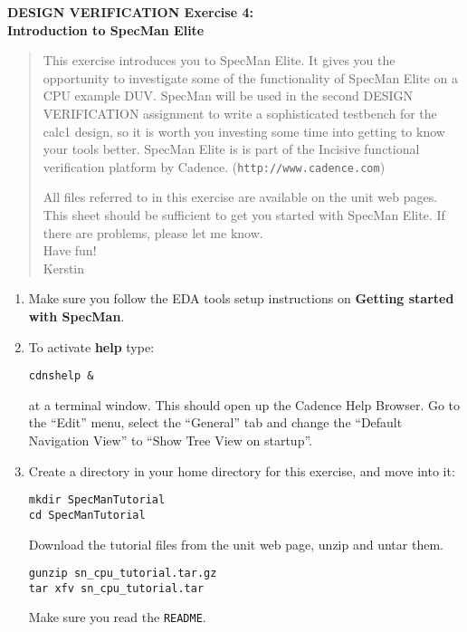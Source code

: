 \documentclass[a4paper,11pt]{article}
\begin{document}
\thispagestyle{empty}
\begin{center}
{\Large\bf DESIGN VERIFICATION Exercise 4: \\ 
\smallskip Introduction to SpecMan Elite}
\end{center}

\begin{quote}
  This exercise introduces you to SpecMan Elite. It gives you the opportunity
  to investigate some of the functionality of SpecMan Elite on a CPU example
  DUV. SpecMan will be used in the second DESIGN VERIFICATION assignment to
  write a sophisticated testbench for the calc1 design, so it is worth you
  investing some time into getting to know your tools better. SpecMan Elite is
  is part of the Incisive functional verification platform by Cadence.
  (\verb#http://www.cadence.com#)
  
  All files referred to in this exercise are available on the unit web
  pages. This sheet should be sufficient to get you started with SpecMan Elite. 
  If there are problems, please let me know. \\ Have fun! \\
  \hspace*{125mm} Kerstin
\end{quote}

\smallskip
{}
\smallskip

\begin{enumerate}

\item Make sure you follow the EDA tools setup instructions on {\bf Getting
    started with SpecMan}.

\item To activate {\bf help} type:

\verb#cdnshelp &#

at a terminal window. This should open up the Cadence Help Browser. Go to the
``Edit'' menu, select the ``General'' tab and change the 
``Default Navigation View'' to ``Show Tree View on startup''.


\item Create a directory in your home directory for this exercise, 
and move into it:

\verb#mkdir SpecManTutorial#\\
\verb#cd SpecManTutorial#

Download the tutorial files from the unit web page, unzip and untar them.

\verb#gunzip sn_cpu_tutorial.tar.gz#\\
\verb#tar xfv sn_cpu_tutorial.tar#

Make sure you read the \verb#README#.

\end{enumerate}
\end{document}
